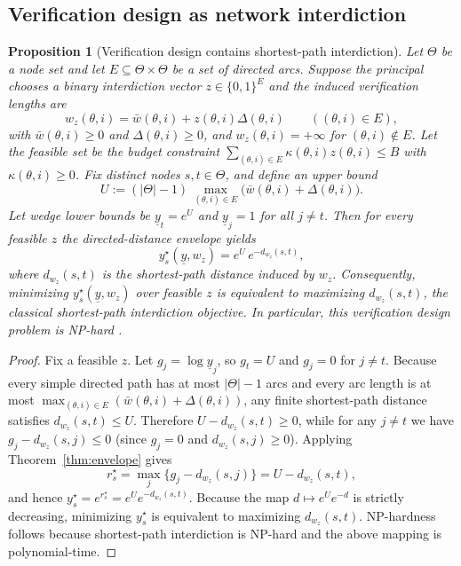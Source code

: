 \documentclass[final,3p,times]{elsarticle}
\theoremstyle{plain}
\newtheorem{proposition}{Proposition}
\theoremstyle{definition}
\newcommand{\1}{\mathbbm{1}}
\newcommand{\ThetaSet}{\Theta}
\begin{document}
\subsection{Verification design as network interdiction}

\begin{proposition}[Verification design contains shortest-path interdiction]\label{prop:interdiction}
Let $\ThetaSet$ be a node set and let $E\subseteq \ThetaSet\times\ThetaSet$ be a set of directed arcs.
Suppose the principal chooses a binary interdiction vector $z\in\{0,1\}^E$ and the induced verification lengths are
\[
w_z(\theta,i)=\bar w(\theta,i)+z(\theta,i)\Delta(\theta,i)\qquad ((\theta,i)\in E),
\]
with $\bar w(\theta,i)\ge 0$ and $\Delta(\theta,i)\ge 0$, and $w_z(\theta,i)=+\infty$ for $(\theta,i)\notin E$.
Let the feasible set be the budget constraint $\sum_{(\theta,i)\in E} \kappa(\theta,i)z(\theta,i)\le B$ with $\kappa(\theta,i)\ge 0$.
Fix distinct nodes $s,t\in\ThetaSet$, and define an upper bound
\[
U := (|\ThetaSet|-1)\,\max_{(\theta,i)\in E}\big(\bar w(\theta,i)+\Delta(\theta,i)\big).
\]
Let wedge lower bounds be $\underline y_t=e^{U}$ and $\underline y_j=1$ for all $j\neq t$.
Then for every feasible $z$ the directed-distance envelope yields
\[
y^\star_s(\underline y,w_z)=e^{U}\,e^{-d_{w_z}(s,t)},
\]
where $d_{w_z}(s,t)$ is the shortest-path distance induced by $w_z$.
Consequently, minimizing $y^\star_s(\underline y,w_z)$ over feasible $z$ is equivalent to maximizing $d_{w_z}(s,t)$,
the classical shortest-path interdiction objective.
In particular, this verification design problem is NP-hard \citep{KhachiyanEtAl2008}.
\end{proposition}

\begin{proof}
Fix a feasible $z$. Let $g_j=\log \underline y_j$, so $g_t=U$ and $g_j=0$ for $j\neq t$.
Because every simple directed path has at most $|\ThetaSet|-1$ arcs and every arc length is at most
$\max_{(\theta,i)\in E}(\bar w(\theta,i)+\Delta(\theta,i))$, any finite shortest-path distance satisfies
$d_{w_z}(s,t)\le U$. Therefore $U-d_{w_z}(s,t)\ge 0$, while for any $j\neq t$ we have
$g_j-d_{w_z}(s,j)\le 0$ (since $g_j=0$ and $d_{w_z}(s,j)\ge 0$).
Applying Theorem~\ref{thm:envelope} gives
\[
r^\star_s=\max_{j}\{g_j-d_{w_z}(s,j)\}=U-d_{w_z}(s,t),
\]
and hence $y^\star_s=e^{r^\star_s}=e^{U}e^{-d_{w_z}(s,t)}$.
Because the map $d\mapsto e^{U}e^{-d}$ is strictly decreasing, minimizing $y^\star_s$ is equivalent to maximizing $d_{w_z}(s,t)$.
NP-hardness follows because shortest-path interdiction is NP-hard \citep{KhachiyanEtAl2008} and the above mapping is polynomial-time.
\end{proof}
\end{document}
